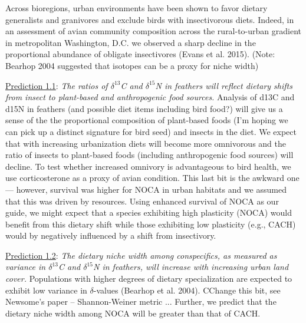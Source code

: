\documentclass[12pt]{article}
\begin{document}

 Across bioregions, urban environments have been shown to favor dietary generalists and granivores and exclude birds with insectivorous diets. Indeed, in an assessment of avian community composition across the rural-to-urban gradient in metropolitan Washington, D.C. we observed a sharp decline in the proportional abundance of obligate insectivores (Evans et al. 2015). (Note: Bearhop 2004 suggested that isotopes can be a proxy for niche width)\par


\noindent \underline{Prediction 1.1}: \textit{The ratios of $\delta^{13}$C and $\delta^{15}$N in feathers will reflect dietary shifts from insect to plant-based and anthropogenic food sources.}  Analysis of d13C and d15N in feathers (and possible diet items including bird food?) will give us a sense of the the proportional composition of plant-based foods (I’m hoping we can pick up a distinct signature for bird seed) and insects in the diet. We expect that with increasing urbanization diets will become more omnivorous and the ratio of insects to plant-based foods (including anthropogenic food sources) will decline. To test whether increased omnivory is advantageous to bird health, we use corticosterone as a proxy of avian condition. This last bit is the awkward one — however, survival was higher for NOCA in urban habitats and we assumed that this was driven by resources. Using enhanced survival of NOCA as our guide, we might expect that a species exhibiting high plasticity (NOCA) would benefit from this dietary shift while those exhibiting low plasticity (e.g., CACH) would by negatively influenced by a shift from insectivory.\par


\noindent \underline{Prediction 1.2}: \textit{ The dietary niche width among conspecifics, as measured as variance in $\delta^{13}$C and $\delta^{15}$N in feathers,  will increase with increasing urban land cover.} Populations with higher degrees of dietary specialization are expected to exhibit low variance in $\delta$-values (Bearhop et al. 2004). CChange this bit, see Newsome's paper -- Shannon-Weiner metric ... Further, we predict that the dietary niche width among NOCA will be greater than that of CACH. \par
\end{document}
